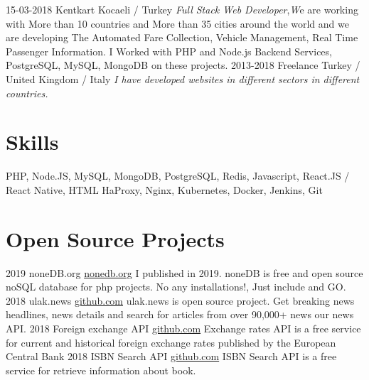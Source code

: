 \documentclass[]{friggeri-cv}
\begin{document}
\begin{entrylist}
  \entry
    {15-03-2018}
    {Kentkart}
    {Kocaeli / Turkey}
    {\emph{Full Stack Web Developer},\emph We are working with More than 10 countries and More than 35 cities around the world and we are developing The Automated Fare Collection, Vehicle Management, Real Time Passenger Information.
I Worked with PHP and Node.js Backend Services, PostgreSQL, MySQL, MongoDB on these projects.}
  \entry
    {2013-2018}
    {Freelance}
    {Turkey / United Kingdom / Italy}
    {\emph{I have developed websites in different sectors in different countries.}}
\end{entrylist}

\section{Skills}

PHP, Node.JS, MySQL, MongoDB, PostgreSQL, Redis, Javascript, React.JS / React Native, HTML
HaProxy, Nginx, Kubernetes, Docker, Jenkins, Git

\section{Open Source Projects}

\begin{entrylist}
  \entry
    {2019}
    {noneDB.org}
    {\href{https://github.com/orhanayd/noneDB}{nonedb.org}}
    {I published in 2019. noneDB is free and open source noSQL database for php projects. No any installations!, Just include and GO.}
  \entry
    {2018}
    {ulak.news}
    {\href{https://github.com/orhanayd/ulak.news}{github.com}}
    {ulak.news is open source project. Get breaking news headlines, news details and search for articles from over 90,000+ news our news API. }
  \entry
    {2018}
    {Foreign exchange API}
    {\href{https://github.com/orhanayd/Foreign-exchange-API}{github.com}}
    {Exchange rates API is a free service for current and historical foreign exchange rates
published by the European Central Bank}
  \entry
    {2018}
    {ISBN Search API}
    {\href{https://github.com/orhanayd/isbn-search}{github.com}}
    {ISBN Search API is a free service for retrieve information about book.}
\end{entrylist}
\end{document}
